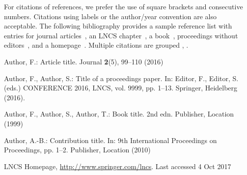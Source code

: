 \documentclass[runningheads]{llncs}
\begin{document}
For citations of references, we prefer the use of square brackets
and consecutive numbers. Citations using labels or the author/year
convention are also acceptable. The following bibliography provides
a sample reference list with entries for journal
articles~\cite{ref_article1}, an LNCS chapter~\cite{ref_lncs1}, a
book~\cite{ref_book1}, proceedings without editors~\cite{ref_proc1},
and a homepage~\cite{ref_url1}. Multiple citations are grouped
\cite{ref_article1,ref_lncs1,ref_book1},
\cite{ref_article1,ref_book1,ref_proc1,ref_url1}.
\fi
%
%

%



\begin{thebibliography}{8}

Author, F.: Article title. Journal \textbf{2}(5), 99--110 (2016)

Author, F., Author, S.: Title of a proceedings paper. In: Editor,
F., Editor, S. (eds.) CONFERENCE 2016, LNCS, vol. 9999, pp. 1--13.
Springer, Heidelberg (2016). 

Author, F., Author, S., Author, T.: Book title. 2nd edn. Publisher,
Location (1999)

Author, A.-B.: Contribution title. In: 9th International Proceedings
on Proceedings, pp. 1--2. Publisher, Location (2010)

LNCS Homepage, \url{http://www.springer.com/lncs}. Last accessed 4
Oct 2017
\end{thebibliography}
\fi
\end{document}

